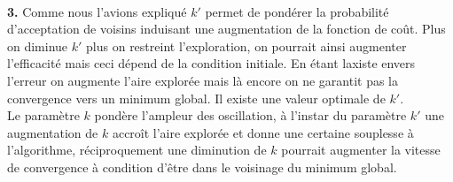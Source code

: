 \documentclass[12pt]{article}
\begin{document}
\\
\textbf{\color{brick}3.} Comme nous l'avions expliqué $k'$ permet de pondérer la probabilité d'acceptation de voisins induisant une augmentation de la fonction de coût. Plus on diminue $k'$ plus on restreint l'exploration, on pourrait ainsi  augmenter l'efficacité mais ceci dépend de la condition initiale. En étant laxiste envers l'erreur on augmente l'aire explorée mais là encore  on ne garantit pas la convergence vers un minimum global. Il existe une valeur optimale de $k'$.\\
Le paramètre $k$ pondère l'ampleur des oscillation, à l'instar du paramètre $k'$ une augmentation de $k$ accroît l'aire explorée et donne une certaine souplesse à l'algorithme, réciproquement une diminution de $k$ pourrait augmenter la vitesse de convergence à condition d'être dans le voisinage du minimum global.
\end{document}
